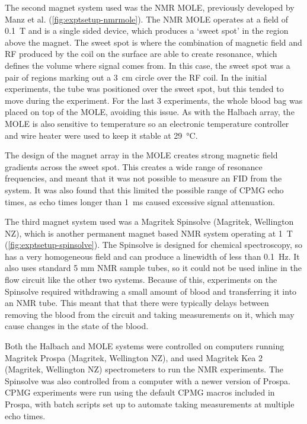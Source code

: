 The second magnet system used was the NMR MOLE, previously developed by Manz et al.\cite{ManzmobileonesidedNMR2006} (\autoref{fig:exptsetup-nmrmole}).
The NMR MOLE operates at a field of \SI{0.1}{T} and is a single sided device, which produces a `sweet spot' in the region above the magnet.
The sweet spot is where the combination of magnetic field and RF produced by the coil on the surface are able to create resonance, which defines the volume where signal comes from.
In this case, the sweet spot was a pair of regions marking out a \SI{3}{cm} circle over the RF coil.
In the initial experiments, the tube was positioned over the sweet spot, but this tended to move during the experiment.
For the last 3 experiments, the whole blood bag was placed on top of the MOLE, avoiding this issue.
As with the Halbach array, the MOLE is also sensitive to temperature so an electronic temperature controller and wire heater were used to keep it stable at \SI{29}{\celsius}.

The design of the magnet array in the MOLE creates strong magnetic field gradients across the sweet spot.
This creates a wide range of resonance frequencies, and meant that it was not possible to measure an FID from the system.
It was also found that this limited the possible range of CPMG echo times, as echo times longer than \SI{1}{ms} caused excessive signal attenuation.

The third magnet system used was a Magritek Spinsolve (Magritek, Wellington NZ), which is another permanent magnet based NMR system operating at \SI{1}{T} (\autoref{fig:exptsetup-spinsolve}).
The Spinsolve is designed for chemical spectroscopy, so has a very homogeneous field and can produce a linewidth of less than \SI{0.1}{Hz}.
It also uses standard 5 mm NMR sample tubes, so it could not be used inline in the flow circuit like the other two systems.
Because of this, experiments on the Spinsolve required withdrawing a small amount of blood and transferring it into an NMR tube.
This meant that that there were typically delays between removing the blood from the circuit and taking measurements on it, which may cause changes in the state of the blood.

Both the Halbach and MOLE systems were controlled on computers running Magritek Prospa (Magritek, Wellington NZ), and used Magritek Kea 2 (Magritek, Wellington NZ) spectrometers to run the NMR experiments.
The Spinsolve was also controlled from a computer with a newer version of Prospa.
CPMG experiments were run using the default CPMG macros included in Prospa, with batch scripts set up to automate taking measurements at multiple echo times.

